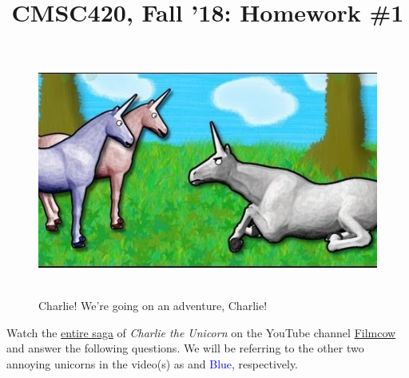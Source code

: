 \documentclass[letterpaper,12pt]{article}
\title{CMSC420, Fall '18: Homework \#1}
\begin{document}
\begin{flushleft}
\end{flushleft}



\newcommand{\redun}{\makered{red}}
\newcommand{\blueun}{\textcolor{blue}{blue}}
\newcommand{\Redun}{\makered{Red}}
\newcommand{\Blueun}{\textcolor{blue}{Blue}}

\begin{figure}[H]
	\centering
	\includegraphics[scale=.5]{img/charlie}
	\ \\[.1in] 
	\caption*{ Charlie! We're going on an adventure, Charlie!}
	\label{fig:charlie}
\end{figure}


Watch the \href{https://www.youtube.com/watch?v=fZu3P0OsQPk}{entire saga} of {\em Charlie the Unicorn} on the YouTube channel \href{https://www.youtube.com/channel/UCV3iHQsE2h3CH-LehgPRkMg}{Filmcow} and answer the following questions. We will be referring to the other two annoying unicorns in the video(s) as \Redun{} and \Blueun, respectively.

\end{document}
